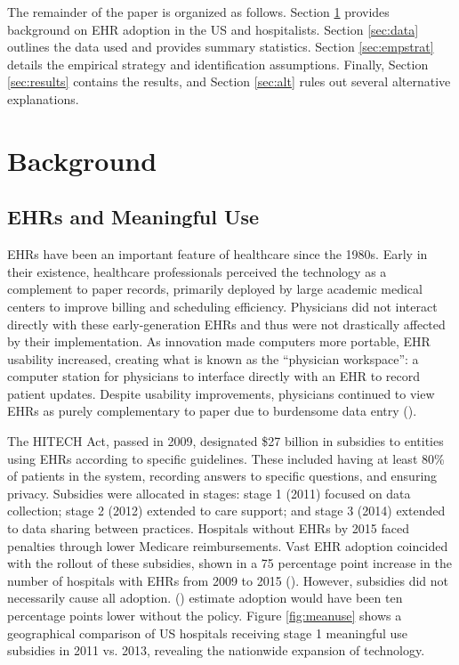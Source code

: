 \documentclass[12pt]{article}
\begin{document}
The remainder of the paper is organized as follows. Section \ref{sec:background} provides background on EHR adoption in the US and hospitalists. Section \ref{sec:data} outlines the data used and provides summary statistics. Section \ref{sec:empstrat} details the empirical strategy and identification assumptions. Finally, Section \ref{sec:results} contains the results, and Section \ref{sec:alt} rules out several alternative explanations. 




\section{Background}\label{sec:background}

\subsection{EHRs and Meaningful Use}
EHRs have been an important feature of healthcare since the 1980s. Early in their existence, healthcare professionals perceived the technology as a complement to paper records, primarily deployed by large academic medical centers to improve billing and scheduling efficiency. Physicians did not interact directly with these early-generation EHRs and thus were not drastically affected by their implementation. As innovation made computers more portable, EHR usability increased, creating what is known as the ``physician workspace'': a computer station for physicians to interface directly with an EHR to record patient updates. Despite usability improvements, physicians continued to view EHRs as purely complementary to paper due to burdensome data entry (\cite{evans2016electronic}).

The HITECH Act, passed in 2009, designated \$27 billion in subsidies to entities using EHRs according to specific guidelines. These included having at least 80\% of patients in the system, recording answers to specific questions, and ensuring privacy. Subsidies were allocated in stages: stage 1 (2011) focused on data collection; stage 2 (2012) extended to care support; and stage 3 (2014) extended to data sharing between practices. Hospitals without EHRs by 2015 faced penalties through lower Medicare reimbursements. Vast EHR adoption coincided with the rollout of these subsidies, shown in a 75 percentage point increase in the number of hospitals with EHRs from 2009 to 2015 (\cite{stats}). However, subsidies did not necessarily cause all adoption. \citeauthor{dranove2015investment} (\citeyear{dranove2015investment}) estimate adoption would have been ten percentage points lower without the policy. Figure \ref{fig:meanuse} shows a geographical comparison of US hospitals receiving stage 1 meaningful use subsidies in 2011 vs. 2013, revealing the nationwide expansion of technology.
\end{document}
